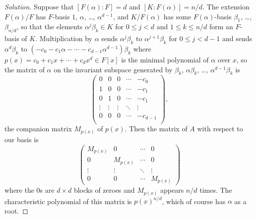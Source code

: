 \documentclass[10pt]{article}
\newenvironment{soln}{\begin{proof}[Solution]}{\end{proof}}
\begin{document}
\begin{soln}
    Suppose that $[F(\alpha) : F] = d$ and $[K : F(\alpha)] = n/d$.
    The extension $F(\alpha)/F$ has $F$-basis
    $1$, $\alpha$, \dots, $\alpha^{d-1}$,
    and $K/F(\alpha)$ has some $F(\alpha)$-basis
    $\beta_1$, \dots, $\beta_{n/d}$, so that
    the elements $\alpha^j \beta_k\in K$
    for $0\le j < d$ and $1\le k \le n/d$ form an $F$-basis of $K$.
    Multiplication by $\alpha$ sends
    $\alpha^j\beta_k$ to $\alpha^{j+1}\beta_k$
    for $0\le j < d-1$ and sends $\alpha^d\beta_k$ to
    $(-c_0-c_1\alpha-\cdots-c_{d-1}\alpha^{d-1})\beta_k$
    where $p(x) = c_0 + c_1x + \cdots + c_dx^d\in F[x]$
    is the minimal polynomial of $\alpha$ over $x$,
    so the matrix of $\alpha$ on the invariant subspace
    generated by $\beta_k$, $\alpha\beta_k$, \dots, $\alpha^{d-1}\beta_k$ is
    \begin{equation*}
        \begin{pmatrix}
	    0 & 0 & 0 & \cdots & -c_0\\
	    1 & 0 & 0 & \cdots & -c_1\\
	    0 & 1 & 0 & \cdots & -c_1\\
	    \vdots & \vdots & \vdots & \ddots & \vdots\\
	    0 & 0 & 0 & \cdots & -c_{d-1}\\
        \end{pmatrix},
    \end{equation*}
    the companion matrix $M_{p(x)}$ of $p(x)$.
    Then the matrix of $A$ with respect to our basis is
    \begin{equation*}
	\begin{pmatrix}
	    M_{p(x)} & 0 & \cdots & 0 \\
	    0 & M_{p(x)} & \cdots & 0 \\
	    \vdots & \vdots & \ddots & \vdots \\
	    0 & 0 & \cdots & M_{p(x)}
	\end{pmatrix}
    \end{equation*}
    where the $0$s are $d\times d$ blocks of zeroes
    and $M_{p(x)}$ appears $n/d$ times.
    The characteristic polynomial of this matrix is
    $p(x)^{n/d}$, which of course has $\alpha$ as a root.


\end{soln}
\end{document}
